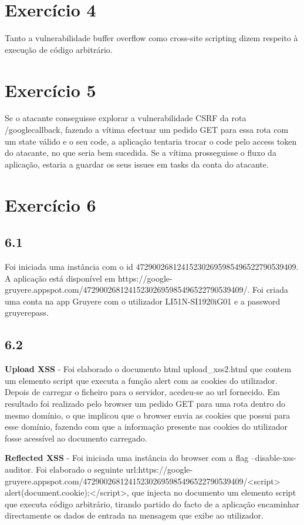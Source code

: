\documentclass[11pt]{report}
\begin{document}
\section{Exercício 4}
	Tanto a vulnerabilidade buffer overflow como cross-site scripting dizem respeito à execução de código arbitrário.

\section{Exercício 5}
Se o atacante conseguisse explorar a vulnerabilidade CSRF da rota /googlecallback, fazendo a vítima efectuar um pedido GET para essa rota com um state válido e o seu code, a aplicação tentaria trocar o code pelo access token do atacante, no que seria bem sucedida. Se a vítima prosseguisse o fluxo da aplicação, estaria a guardar os seus issues em tasks da conta do atacante.

\newpage

\section{Exercício 6}
	\subsection*{6.1}
	Foi iniciada uma instância com o id 472900268124152302695985496522790539409. A aplicação está disponível em https://google-gruyere.appspot.com/472900268124152302695985496522790539409/.
	Foi criada uma conta na app Gruyere com o utilizador LI51N-SI1920iG01 e a password gruyerepass.
	\subsection*{6.2}
	 \textbf{Upload XSS} - Foi elaborado o documento html upload\_xss2.html que contem um elemento script que executa a função alert com as cookies do utilizador. Depois de carregar o ficheiro para o servidor, acedeu-se ao url fornecido. Em resultado foi realizado pelo browser um pedido GET para uma rota dentro do mesmo domínio, o que implicou que o browser envia as cookies que possui para esse domínio, fazendo com que a informação presente nas cookies do utilizador fosse acessível ao documento carregado.
	 \newline
	 
	 \textbf{Reflected XSS} - Foi iniciada uma instância do browser com a flag --disable-xss-auditor. Foi elaborado o seguinte url:\newline https://google-gruyere.appspot.com/472900268124152302695985496522790539409/<script>\newline
	 alert(document.cookie);</script>\newline, que injecta no documento um elemento script que executa código arbitrário, tirando partido do facto de a aplicação encaminhar directamente os dados de entrada na mensagem que exibe ao utilizador.
	 \newline
	 
\end{document}

